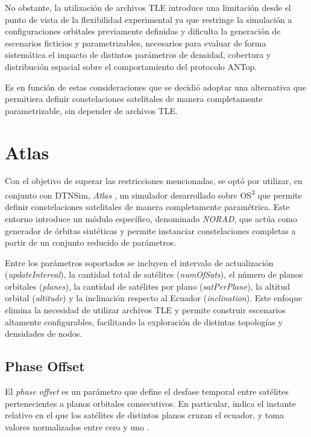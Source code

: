 No obstante, la utilización de archivos TLE introduce una limitación desde el punto de vista de la flexibilidad experimental ya que restringe la simulación a configuraciones orbitales previamente definidas y dificulta la generación de escenarios ficticios y parametrizables, necesarios para evaluar de forma sistemática el impacto de distintos parámetros de densidad, cobertura y distribución espacial sobre el comportamiento del protocolo ANTop.

Es en función de estas consideraciones que se decidió adoptar una alternativa que permitiera definir constelaciones satelitales de manera completamente parametrizable, sin depender de archivos TLE.

\section{Atlas}

Con el objetivo de superar las restricciones mencionadas, se optó por utilizar, en conjunto con DTNSim, \textit{Atlas} \cite{atlas}, un simulador desarrollado sobre OS\textsuperscript{3} que permite definir constelaciones satelitales de manera completamente paramétrica. Este entorno introduce un módulo específico, denominado \textit{NORAD}, que actúa como generador de órbitas sintéticas y permite instanciar constelaciones completas a partir de un conjunto reducido de parámetros.

Entre los parámetros soportados se incluyen el intervalo de actualización (\textit{updateInterval}), la cantidad total de satélites (\textit{numOfSats}), el número de planos orbitales (\textit{planes}), la cantidad de satélites por plano (\textit{satPerPlane}), la altitud orbital (\textit{altitude}) y la inclinación respecto al Ecuador (\textit{inclination}). Este enfoque elimina la necesidad de utilizar archivos TLE y permite construir escenarios altamente configurables, facilitando la exploración de distintas topologías y densidades de nodos.

\subsection{Phase Offset}

El \textit{phase offset} es un parámetro que define el desfase temporal entre satélites pertenecientes a planos orbitales consecutivos. En particular, indica el instante relativo en el que los satélites de distintos planos cruzan el ecuador, y toma valores normalizados entre cero y uno \cite{walker_phase_offset}.

